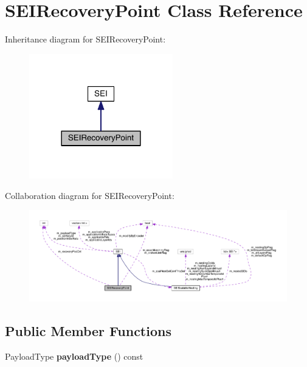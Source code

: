 \hypertarget{class_s_e_i_recovery_point}{}\section{S\+E\+I\+Recovery\+Point Class Reference}
\label{class_s_e_i_recovery_point}


Inheritance diagram for S\+E\+I\+Recovery\+Point\+:
\nopagebreak
\begin{figure}[H]
\begin{center}
\leavevmode
\includegraphics[width=177pt]{d0/de2/class_s_e_i_recovery_point__inherit__graph}
\end{center}
\end{figure}


Collaboration diagram for S\+E\+I\+Recovery\+Point\+:
\nopagebreak
\begin{figure}[H]
\begin{center}
\leavevmode
\includegraphics[width=350pt]{d8/de8/class_s_e_i_recovery_point__coll__graph}
\end{center}
\end{figure}
\subsection*{Public Member Functions}
\begin{DoxyCompactItemize}
\item 
\mbox{\label{class_s_e_i_recovery_point_a81ac1f2660bfb2d52528b20d7b31e2e7}} 
Payload\+Type {\bfseries payload\+Type} () const
\end{DoxyCompactItemize}

